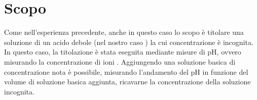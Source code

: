 \section*{Scopo}

Come nell'esperienza precedente, anche in questo caso lo scopo è titolare una
soluzione di un acido debole (nel nostro caso ) la cui concentrazione è incognita.
In questo caso, la titolazione è stata eseguita mediante misure di pH, ovvero misurando la concentrazione di ioni .
Aggiungendo una soluzione basica di concentrazione nota è possibile, misurando l'andamento del pH in funzione del volume di soluzione basica aggiunta, ricavarne la concentrazione della soluzione incognita.

